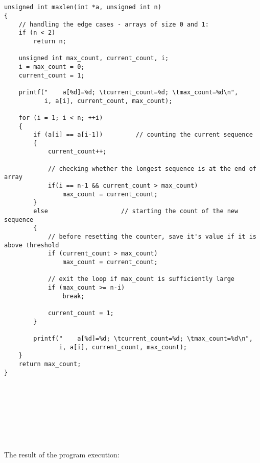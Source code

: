 \documentclass{article}
\begin{document}
\begin{verbatim} 


unsigned int maxlen(int *a, unsigned int n)
{
    // handling the edge cases - arrays of size 0 and 1:
    if (n < 2)                                      
        return n;

    unsigned int max_count, current_count, i;
    i = max_count = 0;
    current_count = 1;

    printf("    a[%d]=%d; \tcurrent_count=%d; \tmax_count=%d\n",
           i, a[i], current_count, max_count);

    for (i = 1; i < n; ++i)
    {
        if (a[i] == a[i-1])         // counting the current sequence
        {
            current_count++;

            // checking whether the longest sequence is at the end of array
            if(i == n-1 && current_count > max_count)
                max_count = current_count;
        }
        else            	    // starting the count of the new sequence
        {
            // before resetting the counter, save it's value if it is above threshold
            if (current_count > max_count)
                max_count = current_count;

            // exit the loop if max_count is sufficiently large
            if (max_count >= n-i)
                break;
                
            current_count = 1;
        }

        printf("    a[%d]=%d; \tcurrent_count=%d; \tmax_count=%d\n",
               i, a[i], current_count, max_count);
    }
    return max_count;
}


\end{verbatim}	
	

	\paragraph{}\
		\paragraph{}\

	
	\rmfamily\
	
		\noindent The result of the program execution:
		
\end{document}
